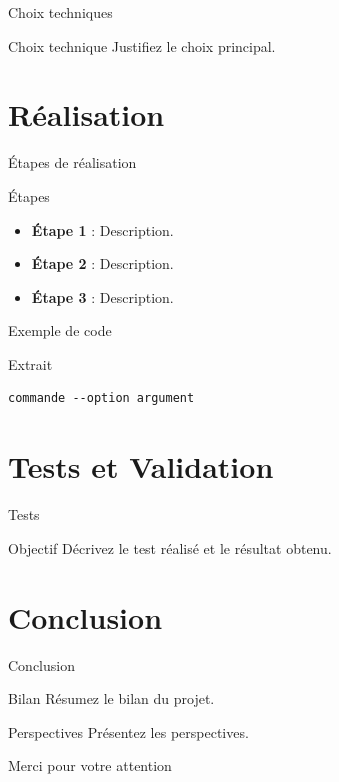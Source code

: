 \documentclass{beamer}
\begin{document}
\begin{frame}{Choix techniques}
\begin{block}{Choix technique}
Justifiez le choix principal.
\end{block}
\end{frame}

\section{Réalisation}
\begin{frame}{Étapes de réalisation}
\begin{block}{Étapes}
    \begin{itemize}
    \item \textbf{Étape 1} : Description.
    \item \textbf{Étape 2} : Description.
    \item \textbf{Étape 3} : Description.
\end{itemize}
\end{block}
\end{frame}

\begin{frame}[fragile]{Exemple de code}
\begin{block}{Extrait}
\begin{verbatim}
commande --option argument
\end{verbatim}
\end{block}
\end{frame}

\section{Tests et Validation}
\begin{frame}{Tests}
\begin{block}{Objectif}
Décrivez le test réalisé et le résultat obtenu.
\end{block}
\end{frame}

\section{Conclusion}
\begin{frame}{Conclusion}
\begin{block}{Bilan}
Résumez le bilan du projet.
\end{block}
\begin{block}{Perspectives}
Présentez les perspectives.
\end{block}
\end{frame}

\begin{frame}
\centering
{ \Huge Merci pour votre attention}
\end{frame}
\end{document}

